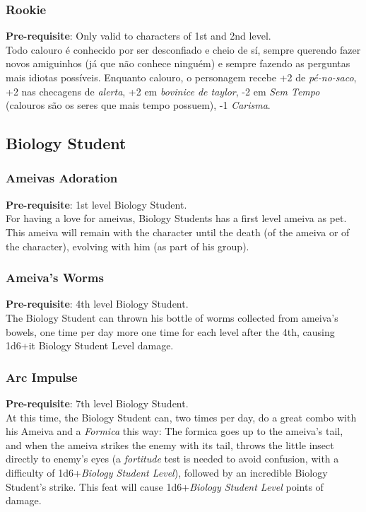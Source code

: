 \documentclass[ letterpaper,12pt]{article}
\begin{document}
\subsubsection{Rookie}
 {\bf Pre-requisite}: Only valid to characters of 1st and 2nd level.\\
 Todo calouro é conhecido por ser desconfiado e cheio de sí, sempre querendo fazer novos amiguinhos (já que não conhece ninguém) e sempre fazendo as perguntas mais idiotas possíveis. Enquanto calouro, o personagem recebe +2 de {\it pé-no-saco}, +2 nas checagens de {\it alerta}, +2 em {\it bovinice de taylor}, -2 em {\it Sem Tempo} (calouros são os seres que mais tempo possuem), -1 {\it Carisma}.

\subsection{Biology Student}

\subsubsection{Ameivas Adoration}
{\bf Pre-requisite}: 1st level Biology Student.\\
For having a love for ameivas, Biology Students has a first level ameiva as pet. This ameiva will remain with the character until the death (of the ameiva or of the character), evolving with him (as part of his group).

\subsubsection{Ameiva's Worms}
{\bf Pre-requisite}: 4th level Biology Student.\\
The Biology Student can thrown his bottle of worms collected from ameiva's bowels, one time per day more one time for each level after the 4th, causing 1d6+{it Biology Student Level} damage.

\subsubsection{Arc Impulse}
{\bf Pre-requisite}: 7th level Biology Student.\\
At this time, the Biology Student can, two times per day, do a great combo with his Ameiva and a {\it Formica} this way: The formica goes up to the ameiva's tail, and when the ameiva strikes the enemy with its tail, throws the little insect directly to enemy's eyes (a {\it fortitude} test is needed to avoid confusion, with a difficulty of 1d6+{\it Biology Student Level}), followed by an incredible Biology Student's strike. This feat will cause 1d6+{\it Biology Student Level} points of damage.
\end{document}

